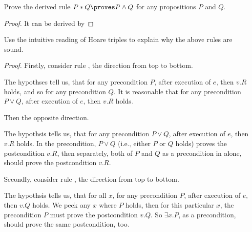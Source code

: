 \begin{exercise}
 Prove the derived rule $P * Q \proves P \wedge Q$ for any propositions $P$ and $Q$.
\end{exercise}

\begin{proof}
  It can be derived by
\end{proof}

\begin{exercise}
  Use the intuitive reading of Hoare triples to explain why the above rules are
  sound.
\end{exercise}

  \hspace*{-2em} \textit{Proof.}
  Firstly, consider rule , the direction from top to
  bottom.

  The hypothses tell us, that for any precondition $P$, after execution of $e$,
  then $v.R$ holds, and so for any precondition $Q$.
  It is reasonable that for any precondition $P \vee Q$, after execution of
  $e$, then $v.R$ holds.

  Then the opposite direction.

  The hypothsis tells us, that for any precondition $P \vee Q$, after execution
  of $e$, then $v.R$ holds.
  In the precondition, $P \vee Q$ (i.e., either $P$ or $Q$ holds) proves
  the postcondition $v.R$, then separately, both of $P$ and $Q$ as a precondition
  in alone, should prove the postcondition $v.R$.

  Secondly, consider rule , the direction from top to
  bottom.

  The hypothsis tells us, that for all $x$, for any precondition $P$, after
  execution of $e$, then $v.Q$ holds.
  We peek any $x$ where $P$ holds, then for this particular $x$, the precondition
  $P$ must prove the postcondition $v.Q$. So $\exists x. P$, as a precondition,
  should prove the same postcondition, too.

